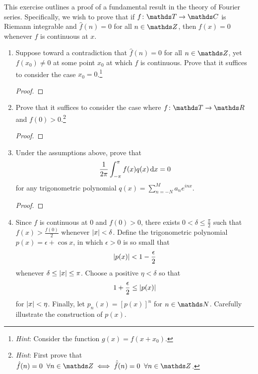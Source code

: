 \documentclass{../homework}
\author{}
\begin{document}
\begin{Exercise}
  This exercise outlines a proof of a fundamental result in the theory
  of Fourier series.  Specifically, we wish to prove that if
  \(f \colon \T \to \C\) is Riemann integrable and \(\hat f(n) = 0\)
  for all \(n \in \Z\), then \(f(x) = 0\) whenever \(f\) is continuous
  at \(x\).
  \begin{enumerate}
  \item Suppose toward a contradiction that \(\hat f (n) = 0\) for all
    \(n \in \Z\), yet \(f(x_0) \neq 0\) at some point \(x_0\) at which
    \(f\) is continuous.  Prove that it suffices to consider the case
    \(x_0 = 0\).\footnote{\emph{Hint}: Consider the function
      \(g(x) = f(x+x_0)\).}

    \begin{solution}
      \begin{proof}

      \end{proof}
    \end{solution}

  \item Prove that it suffices to consider the case where
    \(f \colon \T \to \R\) and \(f(0) > 0\).\footnote{\emph{Hint}:
      First prove that
      \(\hat f (n) = 0 \;\; \forall n \in \Z \iff \hat{\bar f}(n) = 0
      \;\; \forall n \in \Z\).}

    \begin{solution}
      \begin{proof}

      \end{proof}
    \end{solution}

  \item Under the assumptions above, prove that
    \[
      \frac{1}{2\pi} \int_{-\pi}^{\pi} f(x) q(x) \mathop{}\! \mathrm d x = 0
    \]
    for any trigonometric polynomial
    \(q(x) = \sum_{n = -N}^M a_n e^{inx}\).

    \begin{solution}
      \begin{proof}

      \end{proof}
    \end{solution}

  \item Since \(f\) is continuous at \(0\) and \(f(0) > 0\), there
    exists \(0 < \delta \leq \frac{\pi}{2}\) such that
    \(f(x) > \frac{f(0)}{2}\) whenever \(\lvert {x} \rvert < \delta\).  Define
    the trigonometric polynomial \(p(x) = \epsilon + \cos x\), in
    which \(\epsilon > 0\) is so small that
    \begin{equation*}
      \lvert {p(x)} \rvert < 1 - \frac{\epsilon}{2}
    \end{equation*}
    whenever \(\delta \leq \lvert {x} \rvert \leq \pi\).  Choose a positive
    \(\eta < \delta\) so that
    \begin{equation*}
      1 + \frac{ \epsilon}{2} \leq \lvert {p(x)} \rvert
    \end{equation*}
    for \(\lvert {x} \rvert < \eta\).  Finally, let \(p_n(x) = [p(x)]^n\) for
    \(n \in \N\).  Carefully illustrate the construction of \(p(x)\).


\end{enumerate}
\end{Exercise}
\end{document}
